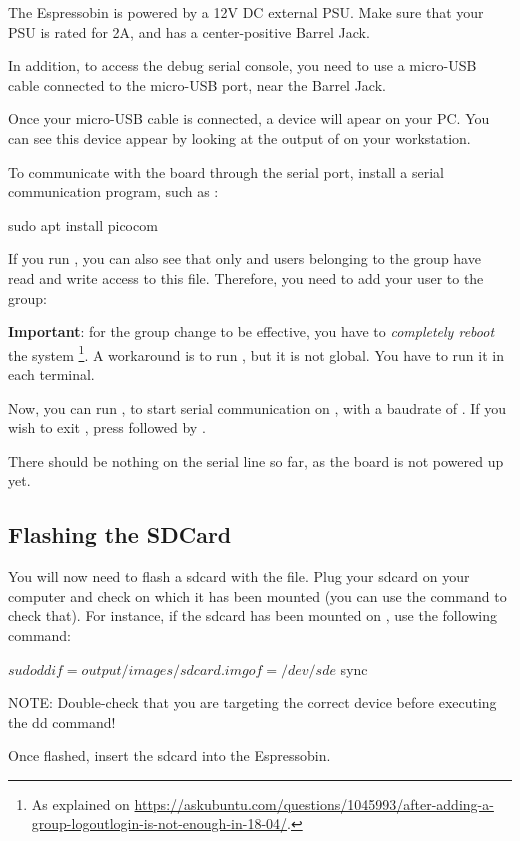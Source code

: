 The Espressobin is powered by a 12V DC external PSU. Make sure that your PSU is rated for 2A, and has a center-positive Barrel Jack.

In addition, to access the debug serial console, you need to use a
micro-USB cable connected to the micro-USB port, near the Barrel Jack.

Once your micro-USB cable is connected, a  device
will apear on your PC. You can see this device appear by looking at
the output of  on your workstation.

To communicate with the board through the serial port, install a
serial communication program, such as :

\begin{hostbashinput}
sudo apt install picocom
\end{hostbashinput}

If you run , you can also see that only
 and users belonging to the  group have read
and write access to this file. Therefore, you need to add your user to
the  group:


{\bf Important}: for the group change to be effective, you have to
{\em completely reboot} the system \footnote{As explained on
\url{https://askubuntu.com/questions/1045993/after-adding-a-group-logoutlogin-is-not-enough-in-18-04/}.}.
A workaround is to run , but it is not global.
You have to run it in each terminal.

Now, you can run , to start
serial communication on , with a baudrate of
. If you wish to exit , press
\code{[Ctrl][a]} followed by \code{[Ctrl][x]}.

There should be nothing on the serial line so far, as the board is not
powered up yet.



\subsection{Flashing the SDCard}

You will now need to flash a sdcard with the 
 file. Plug your sdcard on your computer and
check on which  it has been mounted (you can use the 
command to check that). For instance, if the sdcard has been mounted on
, use the following command:

\begin{hostbashinput}
$ sudo dd if=output/images/sdcard.img of=/dev/sde
$ sync
\end{hostbashinput}

NOTE: Double-check that you are targeting the correct device before executing
the dd command!

Once flashed, insert the sdcard into the Espressobin.

